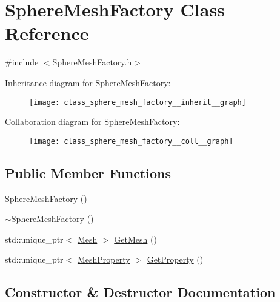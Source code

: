 \hypertarget{class_sphere_mesh_factory}{}\section{Sphere\+Mesh\+Factory Class Reference}
\label{class_sphere_mesh_factory}


{\ttfamily \#include $<$Sphere\+Mesh\+Factory.\+h$>$}



Inheritance diagram for Sphere\+Mesh\+Factory\+:\nopagebreak
\begin{figure}[H]
\begin{center}
\leavevmode
\texttt{[image: class\_sphere\_mesh\_factory\_\_inherit\_\_graph]}
\end{center}
\end{figure}


Collaboration diagram for Sphere\+Mesh\+Factory\+:\nopagebreak
\begin{figure}[H]
\begin{center}
\leavevmode
\texttt{[image: class\_sphere\_mesh\_factory\_\_coll\_\_graph]}
\end{center}
\end{figure}
\subsection*{Public Member Functions}
\begin{DoxyCompactItemize}
\item 
\mbox{\hyperlink{class_sphere_mesh_factory_ae9d1dd79ab6130040200e79bc27aa48a}{Sphere\+Mesh\+Factory}} ()
\item 
\mbox{\hyperlink{class_sphere_mesh_factory_a6c935967e01d1ebedda748c4ff010683}{$\sim$\+Sphere\+Mesh\+Factory}} ()
\item 
std\+::unique\+\_\+ptr$<$ \mbox{\hyperlink{class_mesh}{Mesh}} $>$ \mbox{\hyperlink{class_sphere_mesh_factory_a1af7ab44a55adea946466d4729cb2b52}{Get\+Mesh}} ()
\item 
std\+::unique\+\_\+ptr$<$ \mbox{\hyperlink{class_mesh_property}{Mesh\+Property}} $>$ \mbox{\hyperlink{class_sphere_mesh_factory_af19b3922356cc71d20213556b0eb98a6}{Get\+Property}} ()
\end{DoxyCompactItemize}


\subsection{Constructor \& Destructor Documentation}
\mbox{\label{class_sphere_mesh_factory_ae9d1dd79ab6130040200e79bc27aa48a}} 
